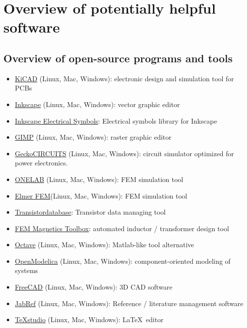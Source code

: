 \chapter{Overview of potentially helpful software} 
\label{cha:software}

\section{Overview of open-source programs and tools}
\begin{itemize}
	\item \href{https://en.wikipedia.org/wiki/KiCad}{KiCAD} (Linux, Mac, Windows): electronic design and simulation tool for PCBs
	\item \href{https://en.wikipedia.org/wiki/Inkscape}{Inkscape} (Linux, Mac, Windows): vector graphic editor
	\item \href{https://github.com/upb-lea/Inkscape_electric_Symbols}{Inkscape Electrical Symbols}: Electrical symbols library for Inkscape
	\item \href{https://en.wikipedia.org/wiki/GIMP}{GIMP} (Linux, Mac, Windows): raster graphic editor
	\item \href{https://github.com/geckocircuits/GeckoCIRCUITS}{GeckoCIRCUITS} (Linux, Mac, Windows): circuit simulator optimized for power electronics. 
	\item \href{https://onelab.info/}{ONELAB} (Linux, Mac, Windows): FEM simulation tool
	\item \href{https://github.com/ElmerCSC/elmerfem}{Elmer FEM}(Linux, Mac, Windows): FEM simulation tool
	\item \href{https://github.com/upb-lea/transistordatabase}{Transistordatabase}: Transistor data  managing tool
	\item \href{https://github.com/upb-lea/FEM_Magnetics_Toolbox}{FEM Magnetics Toolbox}: automated inductor / transformer design tool
	\item \href{https://en.wikipedia.org/wiki/GNU_Octave}{Octave} (Linux, Mac, Windows): Matlab-like tool alternative
	\item \href{https://github.com/OpenModelica/OpenModelica}{OpenModelica} (Linux, Mac, Windows):  component-oriented modeling of systems
	\item \href{https://en.wikipedia.org/wiki/FreeCAD}{FreeCAD} (Linux, Mac, Windows): 3D CAD software
	\item \href{https://en.wikipedia.org/wiki/JabRef}{JabRef} (Linux, Mac, Windows): Reference / literature management software
	\item \href{https://en.wikipedia.org/wiki/TeXstudio}{TeXstudio} (Linux, Mac, Windows): \LaTeX\ editor
\end{itemize}

